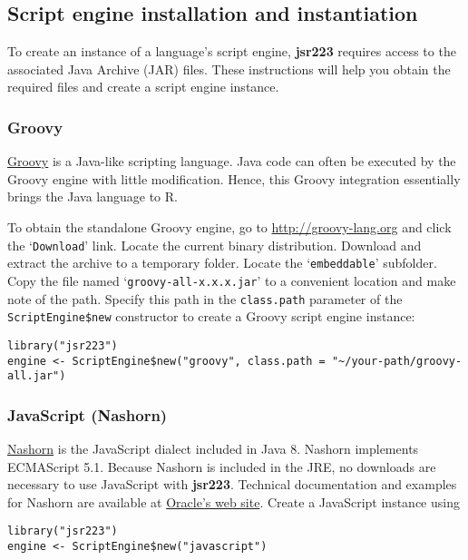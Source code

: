\documentclass[
article,
11pt, %
a4paper, %
oneside, %
headinclude,footinclude, %
]{scrartcl}
\theoremstyle{definition} %
\theoremstyle{plain} %
\theoremstyle{remark} %
\newcommand{\pkg}[1]{\textbf{#1}}
\newcommand{\code}[1]{\texttt{#1}}
\newcommand{\samp}[1]{{`\normalfont\texttt{#1}'}}
\begin{document}
\hypertarget{script-engine-installation}{}
\subsection{Script engine installation and instantiation}

To create an instance of a language's script engine, \pkg{jsr223} requires access to the associated Java Archive (JAR) files. These instructions will help you obtain the required files and create a script engine instance.

\subsubsection{Groovy}

\href{http://groovy-lang.org}{Groovy} is a Java-like scripting language. Java code can often be executed by the Groovy engine with little modification. Hence, this Groovy integration essentially brings the Java language to R.

To obtain the standalone Groovy engine, go to \url{http://groovy-lang.org} and click the \samp{Download} link. Locate the current binary distribution. Download and extract the archive to a temporary folder. Locate the \samp{embeddable} subfolder. Copy the file named \samp{groovy-all-x.x.x.jar} to a convenient location and make note of the path. Specify this path in the \code{class.path} parameter of the \code{ScriptEngine\$new} constructor to create a Groovy script engine instance:

\begin{verbatim}
library("jsr223")
engine <- ScriptEngine$new("groovy", class.path = "~/your-path/groovy-all.jar")
\end{verbatim}

\subsubsection{JavaScript (Nashorn)}

\href{https://docs.oracle.com/javase/8/docs/technotes/guides/scripting/nashorn/}{Nashorn} is the JavaScript dialect included in Java 8. Nashorn implements ECMAScript 5.1. Because Nashorn is included in the JRE, no downloads are necessary to use JavaScript with \pkg{jsr223}. Technical documentation and examples for Nashorn are available at \href{https://docs.oracle.com/javase/8/docs/technotes/guides/scripting/nashorn/}{Oracle's web site}. Create a JavaScript instance using

\begin{verbatim}
library("jsr223")
engine <- ScriptEngine$new("javascript")
\end{verbatim}
\end{document}
